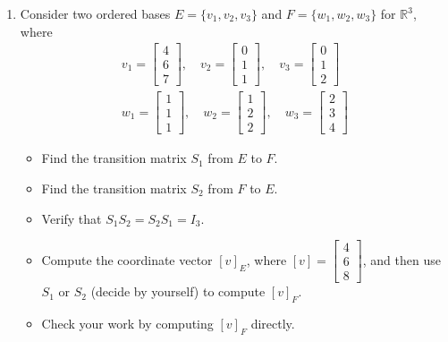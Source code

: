 \documentclass[a4paper,11pt]{article}
\begin{document}
\begin{enumerate}
 \item Consider two ordered bases $E=\{v_1,v_2,v_3\}$ and $F=\{w_1,w_2,w_3\}$ for $\mathbb{R}^3$, where
\begin{align*}
v_1=\left[\begin{array}{c}4 \\ 6 \\ 7\end{array}\right], \quad v_2=\left[\begin{array}{c}0 \\ 1 \\ 1\end{array}\right], \quad v_3=\left[\begin{array}{c}0 \\ 1 \\ 2\end{array}\right]\\
w_1=\left[\begin{array}{c}1 \\ 1 \\ 1\end{array}\right], \quad w_2=\left[\begin{array}{c}1 \\ 2 \\ 2\end{array}\right], \quad w_3=\left[\begin{array}{c}2 \\ 3 \\ 4\end{array}\right]
\end{align*}
\begin{itemize}
\item[(a)] Find the transition matrix $S_1$ from $E$ to $F$.
\item[(b)] Find the transition matrix $S_2$ from $F$ to $E$.
\item[(c)] Verify that $S_1S_2=S_2S_1=I_3$.
\item[(d)] Compute the coordinate vector $[v]_E$, where $[v]=\left[\begin{array}{c} 4 \\ 6\\ 8\end{array}\right]$, and then use $S_1$ or $S_2$ (decide by yourself) to compute $[v]_F$.
\item[(e)] Check your work by computing $[v]_F$ directly.
\end{itemize}



\end{enumerate}
\end{document}
